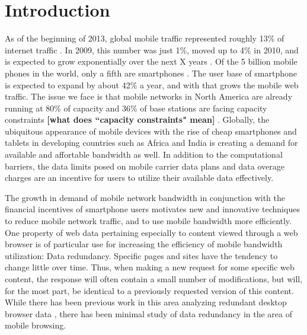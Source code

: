 \section{Introduction}
As of the beginning of 2013, global mobile traffic represented roughly 13\% of internet traffic \cite{?}.
In 2009, this number was just 1\%, moved up to 4\% in 2010, and is expected to grow exponentially over the next X years \cite{?}. Of the 5 billion mobile phones in the world, only a fifth are smartphones \cite{?}. The user base of smartphone is expected to expand by about 42\% a year, and with that grows the mobile web traffic\cite{?}. 
The issue we face is that mobile networks in North America are already running at 80\% of capacity and 36\% of base stations are facing capacity constraints \textbf{[what does ``capacity constraints" mean]} \cite{?}. Globally, the ubiquitous appearance of mobile devices with the rise of cheap smartphones and tablets in developing countries such as Africa and India is creating a demand for available and affortable bandwidth as well. In addition to the computational barriers, the data limits posed on mobile carrier data plans and data overage charges are an incentive for users to utilize their available data effectively. 

The growth in demand of mobile network bandwidth in conjunction with the financial incentives of smartphone users motivates new and innovative techniques to reduce mobile network traffic, and to use mobile bandwidth more efficiently. One property of web data pertaining especially to content viewed through a web browser is of particular use for increasing the efficiency of mobile bandwidth utilization: Data redundancy. Specific pages and sites have the tendency to change little over time. Thus, when making a new request for some specific web content, the response will often contain a small number of modifications, but will, for the most part, be identical to a previously requested version of this content. While there has been previous work in this area analyzing redundant desktop browser data \cite{?}, there has been minimal study of data redundancy in the area of mobile browsing.


